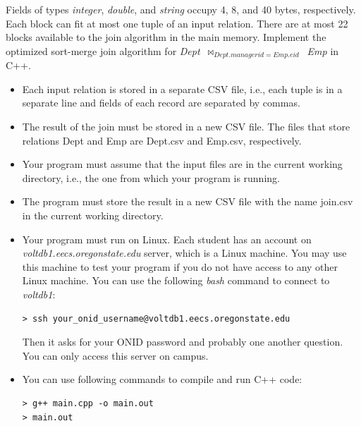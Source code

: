 \documentclass[11pt]{article}
\begin{document}
Fields of types \textit{integer}, \textit{double}, and \textit{string} occupy 4, 8, and 40 bytes, respectively. 
Each block can fit at most one tuple of an input relation. There are at most 22 blocks available to the join algorithm in the main memory.
Implement the optimized sort-merge join algorithm for \textit{Dept}~$\bowtie_{Dept.managerid=Emp.eid}$~\textit{Emp} in C++.
\begin{itemize}
\item Each input relation is stored in a separate CSV file, i.e., each tuple is in a separate line and fields of each record are separated by commas.
\item The result of the join must be stored in a new CSV file.
The files that store relations Dept and Emp are Dept.csv and Emp.csv, respectively. 
\item Your program must assume that the input files are in the current working directory, i.e., the one from which your program is running.
\item The program must store the result in a new CSV file with the name join.csv in the current working directory.
\item Your program must run on Linux. Each student has an account on 
\textit{voltdb1.eecs.oregonstate.edu} server, which is a Linux machine. You may use this machine to test your program if you do not have access to any other Linux machine. You can use the following \textit{bash} command to connect to \textit{voltdb1}:
\begin{verbatim}
> ssh your_onid_username@voltdb1.eecs.oregonstate.edu
\end{verbatim}
Then it asks for your ONID password and probably one another question. You can only access this server on campus.

\item You can use following commands to compile and run C++ code:

\begin{verbatim}
> g++ main.cpp -o main.out
> main.out
\end{verbatim}

\end{itemize}
\end{document}
